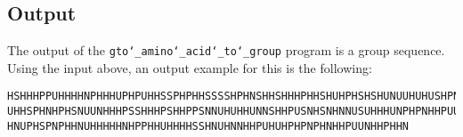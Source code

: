 \subsection*{Output}

The output of the \texttt{gto\char`_amino\char`_acid\char`_to\char`_group} program is a group sequence.\\
Using the input above, an output example for this is the following:
\begin{lstlisting}
HSHHHPPUHHHHNPHHHUPHPUHHSSPHPHHSSSSHPHNSHHSHHHPHHSHUHPHSHSHUNUUHUHUSHPNHUHUSUUHS
UHHSPHNHPHSNUUNHHHPSSHHHPSHHPPSNNUHUHHUNNSHHPUSNHSNHNNUSUHHHUNPHPNHHPUUUSPHHHSUH
HNUPHSPNPHHNUHHHHHNHPPHHUHHHHSSHNUHNNHHPUHUHPHPNPHNHHPUUNHHPHHN
\end{lstlisting}
